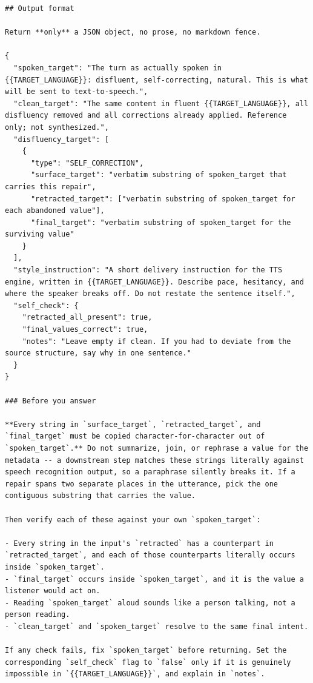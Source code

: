 \documentclass{article}
\begin{document}
\begin{lstlisting}[caption={The one-step spoken-localization prompt (Stage 2, Route A), used verbatim in construction.}, label={lst:localization_prompt}]
## Output format

Return **only** a JSON object, no prose, no markdown fence.

{
  "spoken_target": "The turn as actually spoken in {{TARGET_LANGUAGE}}: disfluent, self-correcting, natural. This is what will be sent to text-to-speech.",
  "clean_target": "The same content in fluent {{TARGET_LANGUAGE}}, all disfluency removed and all corrections already applied. Reference only; not synthesized.",
  "disfluency_target": [
    {
      "type": "SELF_CORRECTION",
      "surface_target": "verbatim substring of spoken_target that carries this repair",
      "retracted_target": ["verbatim substring of spoken_target for each abandoned value"],
      "final_target": "verbatim substring of spoken_target for the surviving value"
    }
  ],
  "style_instruction": "A short delivery instruction for the TTS engine, written in {{TARGET_LANGUAGE}}. Describe pace, hesitancy, and where the speaker breaks off. Do not restate the sentence itself.",
  "self_check": {
    "retracted_all_present": true,
    "final_values_correct": true,
    "notes": "Leave empty if clean. If you had to deviate from the source structure, say why in one sentence."
  }
}

### Before you answer

**Every string in `surface_target`, `retracted_target`, and `final_target` must be copied character-for-character out of `spoken_target`.** Do not summarize, join, or rephrase a value for the metadata -- a downstream step matches these strings literally against speech recognition output, so a paraphrase silently breaks it. If a repair spans two separate places in the utterance, pick the one contiguous substring that carries the value.

Then verify each of these against your own `spoken_target`:

- Every string in the input's `retracted` has a counterpart in `retracted_target`, and each of those counterparts literally occurs inside `spoken_target`.
- `final_target` occurs inside `spoken_target`, and it is the value a listener would act on.
- Reading `spoken_target` aloud sounds like a person talking, not a person reading.
- `clean_target` and `spoken_target` resolve to the same final intent.

If any check fails, fix `spoken_target` before returning. Set the corresponding `self_check` flag to `false` only if it is genuinely impossible in `{{TARGET_LANGUAGE}}`, and explain in `notes`.
\end{lstlisting}
\end{document}

